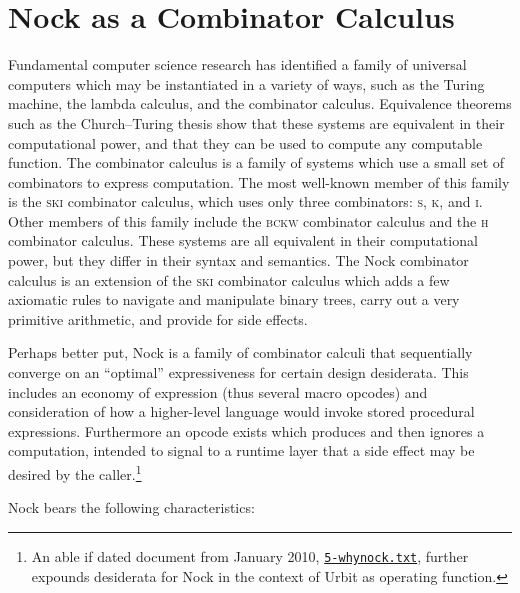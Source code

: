 \documentclass[twoside]{article}
\begin{document}
\section{Nock as a Combinator Calculus}

Fundamental computer science research has identified a family of universal computers which may be instantiated in a variety of ways, such as the Turing machine, the lambda calculus, and the combinator calculus.  Equivalence theorems such as the Church–Turing thesis show that these systems are equivalent in their computational power, and that they can be used to compute any computable function.  The combinator calculus is a family of systems which use a small set of combinators to express computation.  The most well-known member of this family is the \textsc{ski} combinator calculus, which uses only three combinators: \textsc{s}, \textsc{k}, and \textsc{i}.  Other members of this family include the \textsc{bckw} combinator calculus and the \textsc{h} combinator calculus.  These systems are all equivalent in their computational power, but they differ in their syntax and semantics.  The Nock combinator calculus is an extension of the \textsc{ski} combinator calculus which adds a few axiomatic rules to navigate and manipulate binary trees, carry out a very primitive arithmetic, and provide for side effects.

Perhaps better put, Nock is a family of combinator calculi that sequentially converge on an ``optimal'' expressiveness for certain design desiderata.  This includes an economy of expression (thus several macro opcodes) and consideration of how a higher-level language would invoke stored procedural expressions.  Furthermore an opcode exists which produces and then ignores a computation, intended to signal to a runtime layer that a side effect may be desired by the caller.\footnote{An able if dated document from January 2010, \href{https://github.com/cgyarvin/urbit/blob/1bc9086a3fd62594e8bd631744cb9bf804f6a43b/Spec/urbit/5-whynock.txt}{\texttt{5-whynock.txt}}, further expounds desiderata for Nock in the context of Urbit as operating function.}

Nock bears the following characteristics:
\end{document}
